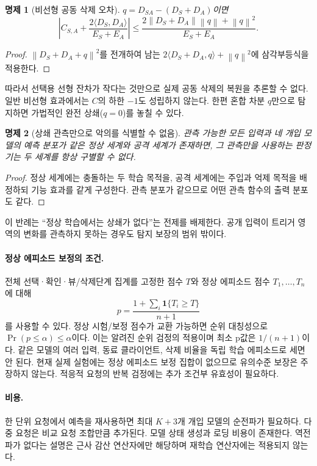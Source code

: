 \documentclass[10pt,a4paper]{article}
\newtheorem{proposition}{명제}
\newcommand{\norm}[1]{\left\lVert#1\right\rVert}
\begin{document}
\begin{proposition}[비선형 공동 삭제 오차]
$q=D_{SA}-(D_S+D_A)$이면
\begin{equation}
 \left|C_{S,A}+\frac{2\langle D_S,D_A\rangle}{E_S+E_A}\right|
 \le\frac{2\norm{D_S+D_A}\norm q+\norm q^2}{E_S+E_A}.
\end{equation}
\end{proposition}
\begin{proof}
$\norm{D_S+D_A+q}^2$를 전개하여 남는
$2\langle D_S+D_A,q\rangle+\norm q^2$에 삼각부등식을 적용한다.
\end{proof}
따라서 선택용 선형 잔차가 작다는 것만으로 실제 공동 삭제의 복원을 추론할 수 없다.
일반 비선형 효과에서는 $C$의 하한 $-1$도 성립하지 않는다.
한편 혼합 차분 $q$만으로 탐지하면 가법적인 완전 상쇄($q=0$)를 놓칠 수 있다.

\begin{proposition}[상쇄 관측만으로 악의를 식별할 수 없음]
관측 가능한 모든 입력과 네 개입 모델의 예측 분포가 같은 정상 세계와 공격 세계가 존재하면,
그 관측만을 사용하는 판정기는 두 세계를 항상 구별할 수 없다.
\end{proposition}
\begin{proof}
정상 세계에는 충돌하는 두 학습 목적을, 공격 세계에는 주입과 억제 목적을 배정하되
기능 효과를 같게 구성한다. 관측 분포가 같으므로 어떤 관측 함수의 출력 분포도 같다.
\end{proof}
이 반례는 ``정상 학습에서는 상쇄가 없다''는 전제를 배제한다.
공개 입력이 트리거 영역의 변화를 관측하지 못하는 경우도 탐지 보장의 범위 밖이다.

\paragraph{정상 에피소드 보정의 조건.}
전체 선택·확인·뷰/삭제단계 집계를 고정한 점수 $T$와 정상 에피소드 점수 $T_1,\dots,T_n$에 대해
\begin{equation}
 p=\frac{1+\sum_i\mathbf1\{T_i\ge T\}}{n+1}
\end{equation}
를 사용할 수 있다. 정상 시험/보정 점수가 교환 가능하면 순위 대칭성으로
$\Pr(p\le\alpha)\le\alpha$이다\cite{exchangeability}.
이는 알려진 순위 검정의 적용이며 최소 p값은 $1/(n+1)$이다.
같은 모델의 여러 입력, 동료 클라이언트, 삭제 비율을 독립 학습 에피소드로 세면 안 된다.
현재 실제 실험에는 정상 에피소드 보정 집합이 없으므로 유의수준 보장은 주장하지 않는다.
적응적 요청의 반복 검정에는 추가 조건부 유효성이 필요하다.

\paragraph{비용.}
한 단위 요청에서 예측을 재사용하면 최대 $K+3$개 개입 모델의 순전파가 필요하다.
다중 요청은 비교 요청 조합만큼 추가된다. 모델 상태 생성과 로딩 비용이 존재한다.
역전파가 없다는 설명은 근사 감산 연산자에만 해당하며 재학습 연산자에는 적용되지 않는다.
\end{document}
